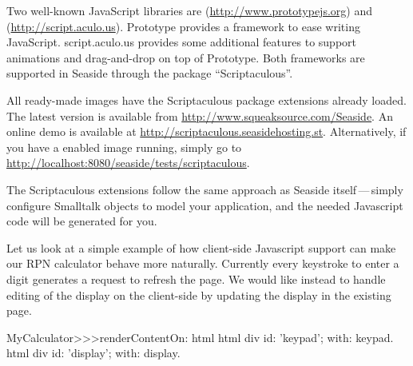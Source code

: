 \documentclass[a4paper,10pt,twoside]{book}
\begin{document}
Two well-known JavaScript libraries are  (\url{http://www.prototypejs.org}) and  (\url{http://script.aculo.us}).
Prototype provides a framework to ease writing JavaScript.
script.aculo.us provides some additional features to support animations and drag-and-drop on top of Prototype.
Both frameworks are supported in Seaside through the package ``Scriptaculous''.

All ready-made images have the Scriptaculous package extensions already loaded.
The latest version is available from \url{http://www.squeaksource.com/Seaside}.
An online demo is available at \url{http://scriptaculous.seasidehosting.st}.
Alternatively, if you have a enabled image running, simply go to \url{http://localhost:8080/seaside/tests/scriptaculous}.

The Scriptaculous extensions follow the same approach as Seaside itself\,---\,simply configure Smalltalk objects to model your application, and the needed Javascript code will be generated for you.

Let us look at a simple example of how client-side Javascript support can make our RPN calculator behave more naturally.
Currently every keystroke to enter a digit generates a request to refresh the page.
We would like instead to handle editing of the display on the client-side by updating the display in the existing page.


\begin{code}{}
MyCalculator>>>renderContentOn: html
	html div id: 'keypad'; with: keypad.
	html div id: 'display'; with: display.	
\end{code}
				
\end{document}
